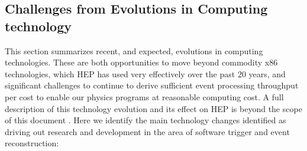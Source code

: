 \subsection{Challenges from Evolutions in Computing technology}

This section summarizes recent, and expected, evolutions in computing technologies. These are both opportunities to move beyond commodity x86 technologies, which HEP has used very effectively over 
the past 20 years, and significant challenges to continue to derive sufficient event processing throughput per cost to enable our physics programs at reasonable computing cost.  A full description 
of this technology evolution and its effect on HEP is beyond the scope of this document \cite{Bird2014}. Here we identify the main technology changes identified as driving out research and development 
in the area of software trigger and event reconstruction:
